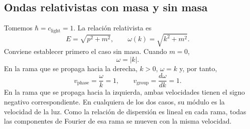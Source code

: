 \subsection{Ondas relativistas con masa y sin masa}

\begin{classroomqa}\end{classroomqa}

\begin{classroomqa}\end{classroomqa}

Tomemos \(\hbar=c_{\mathrm{light}}=1\). La relación relativista es
\begin{equation}
E=\sqrt{p^2+m^2},
\qquad
\omega(k)=\sqrt{k^2+m^2}.
\end{equation}
Conviene establecer primero el caso sin masa. Cuando \(m=0\),
\begin{equation}
\omega=|k|.
\end{equation}
En la rama que se propaga hacia la derecha, \(k>0\), \(\omega=k\) y, por tanto,
\begin{equation}
v_{\mathrm{phase}}=\frac{\omega}{k}=1,
\qquad
v_{\mathrm{group}}=\frac{d\omega}{dk}=1.
\end{equation}
En la rama que se propaga hacia la izquierda, ambas velocidades tienen el signo negativo correspondiente. En cualquiera de los dos casos, su módulo es la velocidad de la luz. Como la relación de dispersión es lineal en cada rama, todas las componentes de Fourier de esa rama se mueven con la misma velocidad.

